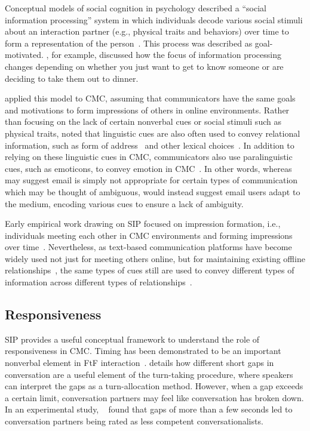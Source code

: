 \documentclass[12pt]{nuthesis}	%
\begin{document}
Conceptual models of social cognition in psychology described a ``social information processing'' system in which individuals decode various social stimuli about an interaction partner (e.g., physical traits and behaviors) over time to form a representation of the person~\citep{lord1985information}. This process was described as goal-motivated. \citet{wyer1980processing}, for example, discussed how the focus of information processing changes depending on whether you just want to get to know someone or are deciding to take them out to dinner.

\citet{walther1992interpersonal} applied this model to CMC, assuming that communicators have the same goals and motivations to form impressions of others in online environments. Rather than focusing on the lack of certain nonverbal cues or social stimuli such as physical traits, \citeauthor{walther1992interpersonal} noted that linguistic cues are also often used to convey relational information, such as form of address~\citep{argyle1976gaze} and other lexical choices~\citep{wiener1968language}. In addition to relying on these linguistic cues in CMC, communicators also use paralinguistic cues, such as emoticons, to convey emotion in CMC~\citep{carey1980paralanguage,sherblom1988direction}. In other words, whereas \citet{daft1986organizational} may suggest email is simply not appropriate for certain types of communication which may be thought of ambiguous, \citeauthor{walther1992interpersonal} would instead suggest email users adapt to the medium, encoding various cues to ensure a lack of ambiguity.

Early empirical work drawing on SIP focused on impression formation, i.e., individuals meeting each other in CMC environments and forming impressions over time~\citep[e.g.,][]{hancock2001impression,markey2002interpersonal,tanis2003social}. Nevertheless, as text-based communication platforms have become widely used not just for meeting others online, but for maintaining existing offline relationships~\citep{grinter2006chatting,pettegrew2015smart}, the same types of cues still are used to convey different types of information across different types of relationships~\citep{derks2008emoticons,pirzadeh2012expression}.

\subsection{Responsiveness}
SIP provides a useful conceptual framework to understand the role of responsiveness in CMC. Timing has been demonstrated to be an important nonverbal element in FtF interaction~\citep{burgoon2016nonverbal}. \citet{mclaughlin1984conversation} details how different short gaps in conversation are a useful element of the turn-taking procedure, where speakers can interpret the gaps as a turn-allocation method. However, when a gap exceeds a certain limit, conversation partners may feel like conversation has broken down. In an experimental study, ~\citet{mclaughlin1982awkward} found that gaps of more than a few seconds led to conversation partners being rated as less competent conversationalists.
\end{document}
